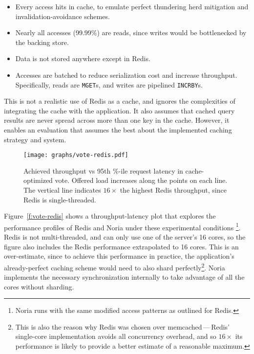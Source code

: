 \begin{itemize}
 \item Every access hits in cache, to emulate perfect thundering herd mitigation
   and invalidation-avoidance schemes.
 \item Nearly all accesses (99.99\%) are reads, since writes would be
   bottlenecked by the backing store.
 \item Data is not stored anywhere except in Redis.
 \item Accesses are batched to reduce serialization cost and increase
   throughput. Specifically, reads are \texttt{MGET}s, and writes are pipelined
    \texttt{INCRBY}s.
\end{itemize}

This is not a realistic use of Redis as a cache, and ignores the complexities of
integrating the cache with the application. It also assumes that cached query
results are never spread across more than one key in the cache. However, it
enables an evaluation that assumes the best about the implemented caching
strategy and system.

\begin{figure}[h]
  \centering
  \texttt{[image: graphs/vote-redis.pdf]}
  \caption{Achieved throughput vs 95th \%-ile request latency in cache-optimized
  vote. Offered load increases along the points on each line. The vertical
  line indicates $16\times$ the highest Redis throughput, since Redis is
  single-threaded.}
  \label{f:vote-redis}
\end{figure}

Figure~\vref{f:vote-redis} shows a throughput-latency plot that explores the
performance profiles of Redis and Noria under these experimental conditions%
\footnote{Noria runs with the same modified access patterns as outlined for
Redis.}.
Redis is not multi-threaded, and can only use one of the server's 16 cores, so
the figure also includes the Redis performance extrapolated to 16 cores. This is
an over-estimate, since to achieve this performance in practice, the
application's already-perfect caching scheme would need to also shard
perfectly\footnote{This is also the reason why Redis was chosen over
memcached\,---\,Redis' single-core implementation avoids all concurrency
overhead, and so $16\times$ its performance is likely to provide a better
estimate of a reasonable maximum.}. Noria implements the necessary
synchronization internally to take advantage of all the cores without sharding.

